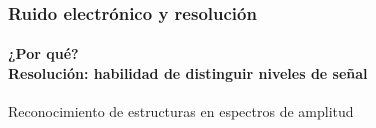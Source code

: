 \documentclass{beamer}
\begin{document}
\begin{frame}
\frametitle{Ruido electrónico y resolución}
\framesubtitle{¿Por qué? \\ Resolución: habilidad de distinguir niveles de señal}
{\color{blue}Reconocimiento de estructuras en espectros de amplitud}
\begin{center}
\end{center}
\end{frame} 
\end{document}

